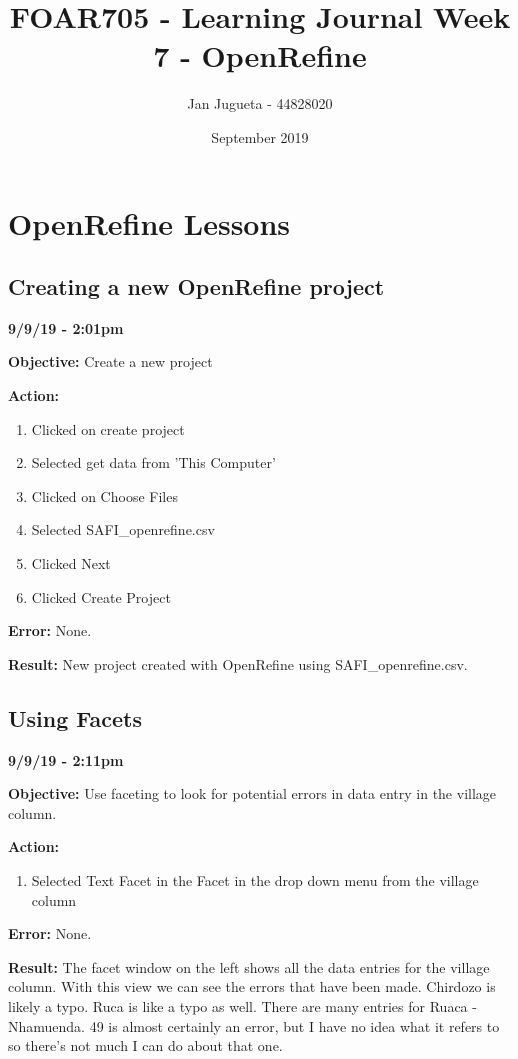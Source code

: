 \documentclass{article}
\title{FOAR705 - Learning Journal Week 7 - OpenRefine}
\author{Jan Jugueta - 44828020}
\date{September 2019}
\begin{document}
\maketitle

\tableofcontents

\newpage
\section{OpenRefine Lessons}

\subsection{Creating a new OpenRefine project}

\textbf{9/9/19 - 2:01pm}

\textbf{Objective:} Create a new project

\textbf{Action:}

\begin{enumerate}
    \item Clicked on create project
    \item Selected get data from 'This Computer'
    \item Clicked on Choose Files
    \item Selected SAFI\_openrefine.csv
    \item Clicked Next
    \item Clicked Create Project
\end{enumerate}

\textbf{Error:} None.

\textbf{Result:} New project created with OpenRefine using SAFI\_openrefine.csv.

\subsection{Using Facets}

\textbf{9/9/19 - 2:11pm}

\textbf{Objective:} Use faceting to look for potential errors in data entry in the village column.

\textbf{Action:}

\begin{enumerate}
    \item Selected Text Facet in the Facet in the drop down menu from the village column
\end{enumerate}

\textbf{Error:} None.

\textbf{Result:} The facet window on the left shows all the data entries for the village column. With this view we can see the errors that have been made. Chirdozo is likely a typo. Ruca is like a typo as well. There are many entries for Ruaca - Nhamuenda. 49 is almost certainly an error, but I have no idea what it refers to so there's not much I can do about that one.
\end{document}
